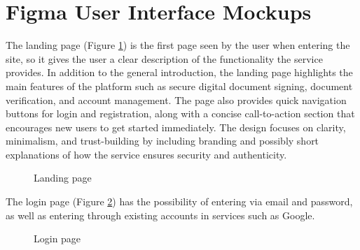 \section{Figma User Interface Mockups}
The landing page (Figure \ref{landing1}) is the first page seen by the user when entering the site, so it gives the user a clear description of the functionality the service provides. 
In addition to the general introduction, the landing page highlights the main features of the platform such as secure digital document signing, document verification, and account management. 
The page also provides quick navigation buttons for login and registration, along with a concise call-to-action section that encourages new users to get started immediately. 
The design focuses on clarity, minimalism, and trust-building by including branding and possibly short explanations of how the service ensures security and authenticity.

\begin{figure}[H]
    \centering
    \caption{Landing page}
    \label{landing1}
\end{figure}

The login page (Figure \ref{login}) has the possibility of entering via email and password, as well as entering through existing accounts in services such as Google. 

\begin{figure}[H]
    \centering
    \caption{Login page}
    \label{login}
\end{figure}


